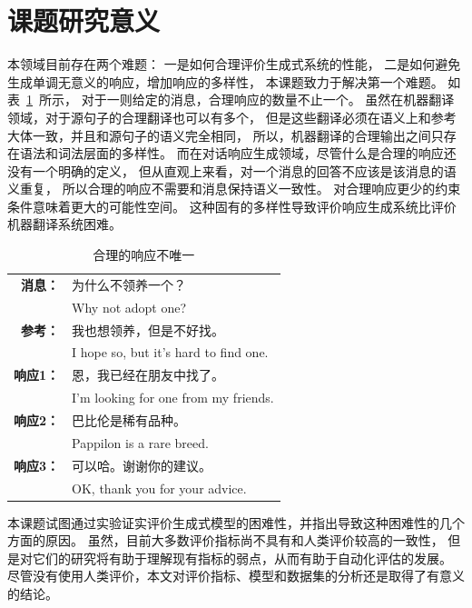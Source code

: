 \section{课题研究意义}\label{sec:research_meaning}
本领域目前存在两个难题：
一是如何合理评价生成式系统的性能，
二是如何避免生成单调无意义的响应，增加响应的多样性，
本课题致力于解决第一个难题。
如表~\ref{tab:multiple_valid_responses}~所示，
对于一则给定的消息，合理响应的数量不止一个。
虽然在机器翻译领域，对于源句子的合理翻译也可以有多个，
但是这些翻译必须在语义上和参考大体一致，并且和源句子的语义完全相同，
所以，机器翻译的合理输出之间只存在语法和词法层面的多样性。
而在对话响应生成领域，尽管什么是合理的响应还没有一个明确的定义，
但从直观上来看，对一个消息的回答不应该是该消息的语义重复，
所以合理的响应不需要和消息保持语义一致性。
对合理响应更少的约束条件意味着更大的可能性空间。
这种固有的多样性导致评价响应生成系统比评价机器翻译系统困难。
\begin{table}
    \centering
    \caption{合理的响应不唯一}
    \label{tab:multiple_valid_responses}
    \begin{tabular}{rl}
        \toprule
        \midrule
        \textbf{消息：} & 为什么不领养一个？ \\
        & Why not adopt one? \\
        \textbf{参考：} & 我也想领养，但是不好找。 \\
        & I hope so, but it's hard to find one. \\
        \midrule
        \textbf{响应1：} & 恩，我已经在朋友中找了。 \\
        & I'm looking for one from my friends. \\
        \textbf{响应2：} & 巴比伦是稀有品种。 \\
        & Pappilon is a rare breed. \\
        \textbf{响应3：} & 可以哈。谢谢你的建议。 \\
        & OK, thank you for your advice. \\
        \bottomrule
    \end{tabular}
\end{table}

本课题试图通过实验证实评价生成式模型的困难性，并指出导致这种困难性的几个方面的原因。
虽然，目前大多数评价指标尚不具有和人类评价较高的一致性，
但是对它们的研究将有助于理解现有指标的弱点，从而有助于自动化评估的发展。
尽管没有使用人类评价，本文对评价指标、模型和数据集的分析还是取得了有意义的结论。

